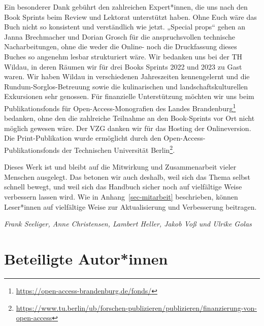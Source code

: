 \documentclass[
  11pt,
  letterpaper,
  DIV=11,
  twoside]{scrreprt}
\DeclareRobustCommand{\href}[2]{#2\footnote{\url{#1}}}
\begin{document}
Ein besonderer Dank gebührt den zahlreichen Expert*innen, die uns nach
den Book Sprints beim Review und Lektorat unterstützt haben. Ohne Euch
wäre das Buch nicht so konsistent und verständlich wie jetzt. „Special
props`` gehen an Janna Brechmacher und Dorian Grosch für die
anspruchsvollen technische Nacharbeitungen, ohne die weder die Online-
noch die Druckfassung dieses Buches so angenehm lesbar strukturiert
wäre. Wir bedanken uns bei der TH Wildau, in deren Räumen wir für drei
Books Sprints 2022 und 2023 zu Gast waren. Wir haben Wildau in
verschiedenen Jahreszeiten kennengelernt und die
Rundum-Sorglos-Betreuung sowie die kulinarischen und
landschaftskulturellen Exkursionen sehr genossen. Für finanzielle
Unterstützung möchten wir uns beim
\href{https://open-access-brandenburg.de/fonds/}{Publikationsfonds für
Open-Access-Monografien des Landes Brandenburg} bedanken, ohne den die
zahlreiche Teilnahme an den Book-Sprints vor Ort nicht möglich gewesen
wäre. Der VZG danken wir für das Hosting der Onlineversion. Die
Print-Publikation wurde ermöglicht durch den
\href{https://www.tu.berlin/ub/forschen-publizieren/publizieren/finanzierung-von-open-access}{Open-Access-Publikationsfonds
der Technischen Universität Berlin}.

Dieses Werk ist und bleibt auf die Mitwirkung und Zusammenarbeit vieler
Menschen ausgelegt. Das betonen wir auch deshalb, weil sich das Thema
selbst schnell bewegt, und weil sich das Handbuch sicher noch auf
vielfältige Weise verbessern lassen wird. Wie in
Anhang~\ref{sec-mitarbeit} beschrieben, können Leser*innen auf
vielfältige Weise zur Aktualisierung und Verbesserung beitragen.

\emph{Frank Seeliger, Anne Christensen, Lambert Heller, Jakob Voß und
Ulrike Golas}

\chapter{Beteiligte Autor*innen}\label{beteiligte-autorinnen}
\end{document}
